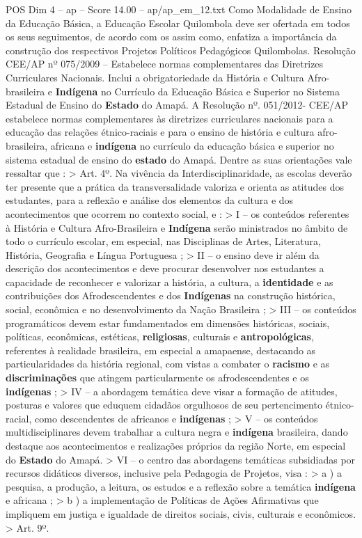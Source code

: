 \begin{textsample}{POS Dim 4 – ap – Score 14.00 – ap/ap\_em\_12.txt}
Como Modalidade de Ensino da Educação Básica, a Educação Escolar Quilombola deve ser ofertada em todos os seus seguimentos, de acordo com os assim como, enfatiza a importância da construção dos respectivos Projetos Políticos Pedagógicos Quilombolas.
Resolução CEE/AP nº 075/2009 – Estabelece normas complementares das Diretrizes Curriculares Nacionais.
Inclui a obrigatoriedade da História e Cultura Afro-brasileira e \textbf{Indígena} no Currículo da Educação Básica e Superior no Sistema Estadual de Ensino do \textbf{Estado} do Amapá.
A Resolução nº. 051/2012- CEE/AP estabelece normas complementares às diretrizes curriculares nacionais para a educação das relações étnico-raciais e para o ensino de história e cultura afro-brasileira, africana e \textbf{indígena} no currículo da educação básica e superior no sistema estadual de ensino do \textbf{estado} do Amapá.
Dentre as suas orientações vale ressaltar que : > Art. 4º.
Na vivência da Interdisciplinaridade, as escolas deverão ter presente que a prática da transversalidade valoriza e orienta as atitudes dos estudantes, para a reflexão e análise dos elementos da cultura e dos acontecimentos que ocorrem no contexto social, e : > I – os conteúdos referentes à História e Cultura Afro-Brasileira e \textbf{Indígena} serão ministrados no âmbito de todo o currículo escolar, em especial, nas Disciplinas de Artes, Literatura, História, Geografia e Língua Portuguesa ; > II – o ensino deve ir além da descrição dos acontecimentos e deve procurar desenvolver nos estudantes a capacidade de reconhecer e valorizar a história, a cultura, a \textbf{identidade} e as contribuições dos Afrodescendentes e dos \textbf{Indígenas} na construção histórica, social, econômica e no desenvolvimento da Nação Brasileira ; > III – os conteúdos programáticos devem estar fundamentados em dimensões históricas, sociais, políticas, econômicas, estéticas, \textbf{religiosas}, culturais e \textbf{antropológicas}, referentes à realidade brasileira, em especial a amapaense, destacando as particularidades da história regional, com vistas a combater o \textbf{racismo} e as \textbf{discriminações} que atingem particularmente os afrodescendentes e os \textbf{indígenas} ; > IV – a abordagem temática deve visar a formação de atitudes, posturas e valores que eduquem cidadãos orgulhosos de seu pertencimento étnico-racial, como descendentes de africanos e \textbf{indígenas} ; > V – os conteúdos multidisciplinares devem trabalhar a cultura negra e \textbf{indígena} brasileira, dando destaque aos acontecimentos e realizações próprios da região Norte, em especial do \textbf{Estado} do Amapá. > VI – o centro das abordagens temáticas subsidiadas por recursos didáticos diversos, inclusive pela Pedagogia de Projetos, visa : > a ) a pesquisa, a produção, a leitura, os estudos e a reflexão sobre a temática \textbf{indígena} e africana ; > b ) a implementação de Políticas de Ações Afirmativas que impliquem em justiça e igualdade de direitos sociais, civis, culturais e econômicos. > Art. 9º.

\end{textsample}
